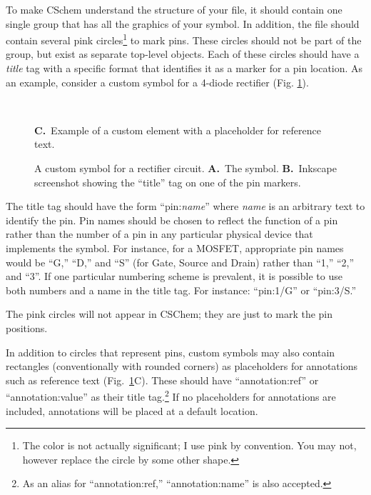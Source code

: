 \documentclass[11pt]{report}
\begin{document}
To make CSchem understand the structure of your file, it should
contain one single group that has all the graphics of your symbol. In
addition, the file should contain several pink circles\footnote{The color is
  not actually significant; I use pink by convention. You may not,
  however replace the circle by some other shape.} to mark pins. These
circles should not be part of the group, but exist as separate
top-level objects. Each of these circles should have a \emph{title}
tag with a specific format that identifies it as a marker for a pin
location. As an example, consider a custom symbol for a 4-diode rectifier (Fig. \ref{fig.acdc}).
%
\begin{figure}[h]
  \mbox{}\hfill
  \begin{minipage}[t]{1.5in}
    \bigskip\bigskip\\
  \end{minipage}
  \hfill
  \hfill\mbox{}
  \caption{A custom symbol for a rectifier circuit. {\bf A.}~The
    symbol. {\bf B.}~Inkscape screenshot showing the ``title'' tag on
    one of the pin markers.} {\bf C.}~Example of a custom element
    with a placeholder for reference text.\label{fig.acdc}
\end{figure}
%
The title tag should have the form ``pin:\emph{name}'' where
\emph{name} is an arbitrary text to identify the pin. Pin names should
be chosen to reflect the function of a pin rather than the number of a
pin in any particular physical device that implements the symbol. For
instance, for a MOSFET, appropriate pin names would be ``G,'' ``D,''
and ``S'' (for Gate, Source and Drain) rather than ``1,'' ``2,'' and
``3''. If one particular numbering scheme is prevalent, it is possible
to use both numbers and a name in the title tag. For instance:
``pin:1/G'' or ``pin:3/S.''

The pink circles will not appear in CSChem; they are just to
mark the pin positions.

In addition to circles that represent pins, custom symbols may also
contain rectangles (conventionally with rounded corners) as
placeholders for annotations such as reference text
(Fig.~\ref{fig.acdc}C). These should have ``annotation:ref'' or
``annotation:value'' as their title tag.\footnote{As an alias for
  ``annotation:ref,'' ``annotation:name'' is also accepted.} If no
placeholders for annotations are included, annotations will be placed
at a default location.
\end{document}
